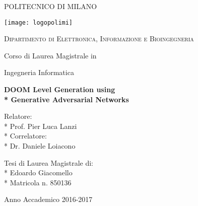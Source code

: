 \begin{titlepage}
	\centering
	
	{\scshape\LARGE POLITECNICO DI MILANO \par}\vspace{0.5cm}
		\texttt{[image: logopolimi]}\par
		\vspace{0.5cm}
	{\scshape\Large Dipartimento di Elettronica, Informazione e Bioingegneria \par}\vspace{1cm}
	\vspace{0.5cm}
	{\Large Corso di Laurea Magistrale in \par}
	{\Large Ingegneria Informatica \par}
	\vspace{1.5cm}
	{\huge\bfseries DOOM Level Generation  
		using \\* Generative Adversarial Networks\par}
	\vspace{2cm}
	 
	\vfill
	\begin{flushleft}
		{\Large 
			Relatore: \\*
			Prof. Pier Luca Lanzi \\*
			Correlatore: \\*
			Dr. Daniele Loiacono
			\par}
	\end{flushleft}
	\begin{flushright}
		{\Large 
			Tesi di Laurea Magistrale di: \\*
			Edoardo Giacomello \\*
			Matricola n. 850136
		}
	\end{flushright}
	 
	\vfill

	{\large Anno Accademico 2016-2017\par}
\end{titlepage}
